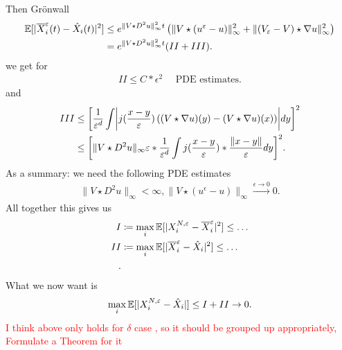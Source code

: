 Then Grönwall 
\begin{align*}
  \mathbb{E}[\lvert\overline{X}_i^{\varepsilon}(t) - \hat{X}_i(t)    \rvert^2] &\le  e^{\|V \star  D^2u\|_{\infty}^2t} \left( \|V \star (u^{\varepsilon}-u )\|_{\infty}^2 + \|(V_{\varepsilon}-V) \star  \nabla u\|_{\infty}^2 \right) \\
                                                              &=e^{\|V \star  D^2u\|_{\infty}^2t} (II + III)
.\end{align*}
we get for 
\begin{align*}
  II \le  C*\epsilon ^{2}  \quad  \text{ PDE estimates}
.\end{align*}
and 
\begin{align*}
  III &\le\bigg[\frac{1}{\epsilon ^{d} }  \int \abs*{j(\frac{x-y}{\epsilon})\left((V\star \nabla u)(y) -  (V \star  \nabla u)(x)\right)} dy\bigg]^2\\
      &\le \bigg[ \|V \star  D^2u\|_{\infty} \epsilon * \frac{1}{\epsilon ^{d} } \int  j(\frac{x-y}{\epsilon})*\frac{\|x-y\|}{\epsilon} dy \bigg ]^2
.\end{align*}
As a summary:  we need  the following PDE estimates
\begin{align*}
  \| V \star  D^2u\|_{\infty} < \infty, \|V \star (u^{\epsilon}- u )\|_{\infty} \xrightarrow{\epsilon\to 0} 0
.\end{align*}
All together this gives us 
\begin{align*}
  I &\coloneqq \max_{i} \mathbb{E}[\lvert X_i^{N,\varepsilon} -\overline{X}_i^{\varepsilon}  \rvert^2] \le \ldots \\
  II &\coloneqq \max_{i} \mathbb{E}[\lvert\overline{X}_i^{\varepsilon}-\hat{X}_i   \rvert^2] \le \ldots \\
.\end{align*}
What we now want is 
\begin{align*}
  \max_i \mathbb{E}[\lvert X_i^{N,\varepsilon} -\hat{X}_i \rvert] \le  I +II \to 0
.\end{align*}
\textcolor{Red}{I think above only holds for $\delta $ case , so it should be grouped up appropriately, Formulate a Theorem for it}

